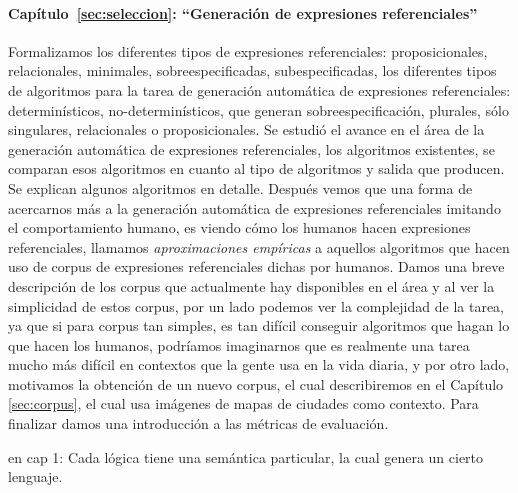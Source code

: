 \paragraph{Cap\'itulo~\ref{sec:seleccion}: ``Generaci\'on de expresiones referenciales''} Formalizamos los diferentes tipos de expresiones referenciales: proposicionales, relacionales, minimales, sobreespecificadas, subespecificadas, los diferentes tipos de algoritmos para la tarea de generaci\'on autom\'atica de expresiones referenciales: determin\'isticos, no-determin\'isticos, que generan sobreespecificaci\'on, 
plurales, s\'olo singulares, relacionales o proposicionales. Se estudi\'o el avance en el \'area de la generaci\'on autom\'atica de expresiones referenciales, los algoritmos existentes, se comparan esos algoritmos en cuanto al tipo de algoritmos y salida que producen. Se explican algunos algoritmos en detalle. 
Despu\'es vemos que una forma de acercarnos m\'as a la generaci\'on autom\'atica de expresiones referenciales  imitando el comportamiento humano, es viendo c\'omo los humanos hacen expresiones referenciales, llamamos {\it aproximaciones emp\'iricas} a aquellos algoritmos que hacen uso de corpus de expresiones referenciales dichas por humanos. Damos una breve descripci\'on de los corpus que actualmente hay disponibles en el \'area y al ver la simplicidad de estos corpus, por un lado podemos ver la complejidad de la tarea, ya que si para corpus tan simples, es tan dif\'icil conseguir algoritmos que hagan lo que hacen los humanos, podr\'iamos imaginarnos que es realmente una tarea mucho m\'as dif\'icil en contextos que la gente usa en la vida diaria, y por otro lado, motivamos la obtenci\'on de un nuevo  corpus, el cual describiremos en el Cap\'itulo \ref{sec:corpus}, el cual usa im\'agenes de mapas de ciudades como contexto. Para finalizar damos una introducci\'on a las m\'etricas de evaluaci\'on. 

en cap 1:
Cada l\'ogica tiene una sem\'antica particular, la cual genera un cierto lenguaje.

